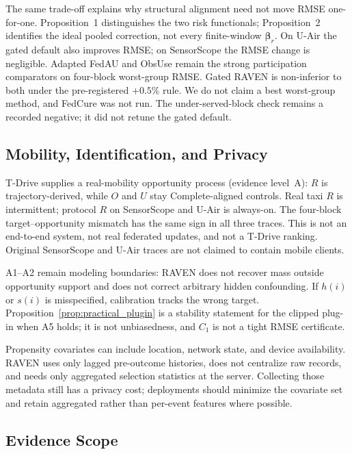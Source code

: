 \documentclass[letterpaper,journal]{IEEEtran}
\begin{document}
The same trade-off explains why structural alignment need not move RMSE
one-for-one.  Proposition~1 distinguishes the two risk functionals;
Proposition~2 identifies the ideal pooled correction, not every
finite-window $\boldsymbol\beta_r$.  On U-Air the gated default also
improves RMSE; on SensorScope the RMSE change is negligible.  Adapted
FedAU and ObsUse remain the strong participation comparators on
four-block worst-group RMSE.  Gated RAVEN is non-inferior to both under
the pre-registered $+0.5\%$ rule.  We do not claim a best worst-group
method, and FedCure was not run.  The under-served-block check remains a
recorded negative; it did not retune the gated default.

\subsection{Mobility, Identification, and Privacy}
\label{subsec:discussion_boundaries}

T-Drive supplies a real-mobility opportunity process (evidence
level~A): $R$ is trajectory-derived, while $O$ and $U$ stay
Complete-aligned controls.  Real taxi $R$ is intermittent; protocol
$R$ on SensorScope and U-Air is always-on.  The four-block
target--opportunity mismatch has the same sign in all three traces.
This is not an end-to-end system, not real federated updates, and not a
T-Drive ranking.  Original SensorScope and U-Air traces are not claimed
to contain mobile clients.

A1--A2 remain modeling boundaries: RAVEN does not recover mass outside
opportunity support and does not correct arbitrary hidden confounding.
If $h(i)$ or $s(i)$ is misspecified, calibration tracks the wrong
target.  Proposition~\ref{prop:practical_plugin} is a stability
statement for the clipped plug-in when A5 holds; it is not
unbiasedness, and $C_1$ is not a tight RMSE certificate.

Propensity covariates can include location, network state, and device
availability.  RAVEN uses only lagged pre-outcome histories, does not
centralize raw records, and needs only aggregated selection statistics
at the server.  Collecting those metadata still has a privacy cost;
deployments should minimize the covariate set and retain aggregated
rather than per-event features where possible.

\subsection{Evidence Scope}
\label{subsec:discussion_evidence_limits}
\end{document}

